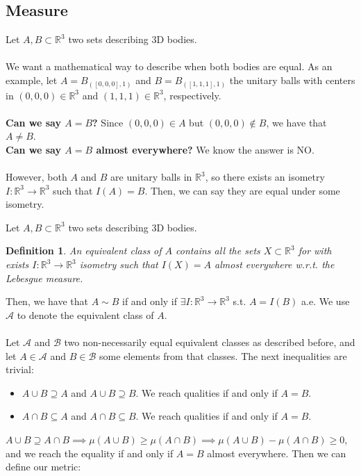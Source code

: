 \documentclass[conference]{IEEEtran}
\newtheorem{definition}{Definition}
\newcommand{\R}{\mathbb{R}}
\begin{document}
\subsection{Measure}

Let $A,B\subset\R^3$ two sets describing 3D bodies.\\
\quad\\
We want a mathematical way to describe when both bodies are equal. As an example, let $A=B_{([0,0,0],1)}$ and $B=B_{([1,1,1],1)}$ the unitary balls with centers in $(0,0,0)\in\R^3$ and $(1,1,1)\in\R^3$, respectively.\\
\quad\\
\textbf{Can we say $A=B$?} Since $(0,0,0)\in A$ but $(0,0,0)\notin B$, we have that $A\neq B$.\\
\textbf{Can we say $A=B$ almost everywhere?} We know the answer is NO.\\
\quad\\
However, both $A$ and $B$ are unitary balls in $\R^3$, so there exists an isometry $I:\R^3\to\R^3$ such that $I(A)=B$. Then, we can say they are equal under some isometry.

Let $A,B\subset\R^3$ two sets describing 3D bodies.
\begin{definition}
An equivalent class of $A$ contains all the sets $X\subset\R^3$ for with exists $I:\R^3\to\R^3$ isometry such that $I(X)=A$ almost everywhere w.r.t. the Lebesgue measure.
\end{definition}
Then, we have that $A\sim B$ if and only if $\exists I:\R^3\to\R^3$ s.t. $A=I(B)$ a.e. We use $\mathcal{A}$ to denote the equivalent class of $A$.\\
\quad\\
Let $\mathcal{A}$ and $\mathcal{B}$ two non-necessarily equal equivalent classes as described before, and let $A\in\mathcal{A}$ and $B\in\mathcal{B}$ some elements from that classes. The next inequalities are trivial:
\begin{itemize}
\item $A\cup B\supseteq A$ and $A\cup B\supseteq B$. We reach qualities if and only if $A=B$.
\item $A\cap B\subseteq A$ and $A\cap B\subseteq B$. We reach qualities if and only if $A=B$.
\end{itemize}

$A\cup B\supseteq A\cap B\implies \mu(A\cup B)\geq\mu(A\cap B)\implies\mu(A\cup B)-\mu(A\cap B)\geq0$, and we reach the equality if and only if $A=B$ almost everywhere. Then we can define our metric:
\end{document}
